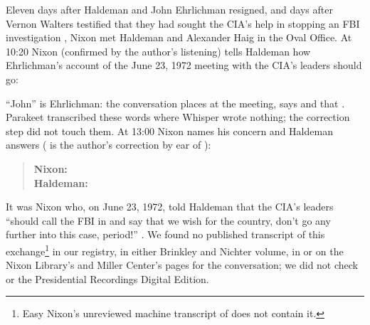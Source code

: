 Eleven days after Haldeman and John Ehrlichman resigned, and days after Vernon Walters testified that they had sought the CIA's help in stopping an FBI investigation \citep{brinkley2015nixontapes1973}, Nixon met Haldeman and Alexander Haig in the Oval Office. At 10:20 Nixon (confirmed by the author's listening) tells Haldeman how Ehrlichman's account of the June 23, 1972 meeting with the CIA's leaders should go:

\begin{quote}\small
{}
\end{quote}

\enquote{John} is Ehrlichman: the conversation places  at the meeting, says  and that . Parakeet transcribed these words where Whisper wrote nothing; the correction step did not touch them. At 13:00 Nixon names his concern and Haldeman answers ( is the author's correction by ear of ):

\begin{quote}\small
\textbf{Nixon:} \\[2pt]
\textbf{Haldeman:} 
\end{quote}

It was Nixon who, on June 23, 1972, told Haldeman that the CIA's leaders \enquote{should call the FBI in and say that we wish for the country, don't go any further into this case, period!} \citep{wspf1974exhibit1}. We found no published transcript of this exchange\footnote{Easy Nixon's unreviewed machine transcript of  \citep{fine2026easynixon} does not contain it.} in our registry, in either Brinkley and Nichter volume, in \citet{dean2014defense} or on the Nixon Library's and Miller Center's pages for the conversation; we did not check \citet{kutler1997abuse} or the Presidential Recordings Digital Edition.

